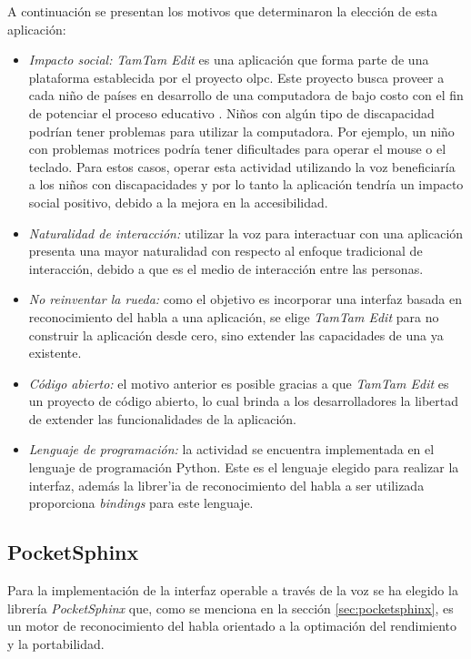 A continuaci\'on se presentan los motivos que determinaron la elecci\'on de esta aplicaci\'on:

\begin{itemize}
    \item \emph{Impacto social:} \emph{TamTam Edit} es una aplicaci\'on que forma parte de una plataforma establecida
    por el proyecto \gls{olpc}. Este proyecto busca proveer
	a cada ni\~no de pa\'ises en desarrollo de una computadora de bajo costo con el
	fin de potenciar el proceso educativo \cite{OLPC}. Ni\~nos con alg\'un tipo de discapacidad podr\'ian tener
	problemas para utilizar la computadora. Por ejemplo, un ni\~no con problemas motrices podr\'ia tener dificultades para operar el mouse
	o el teclado. Para estos casos, operar esta actividad utilizando la voz beneficiar\'ia a los ni\~nos con discapacidades
	y por lo tanto la aplicaci\'on tendr\'ia un impacto social positivo, debido a la mejora en la accesibilidad.
    \item \emph{Naturalidad de interacci\'on:} utilizar la voz para interactuar con una aplicaci\'on presenta una mayor
	naturalidad con respecto al enfoque tradicional de interacci\'on, debido a que es el medio de
	interacci\'on entre las personas.
    \item \emph{No reinventar la rueda:} como el objetivo es incorporar una interfaz basada en reconocimiento del habla a una aplicaci\'on,
	se elige \emph{TamTam Edit} para no construir la aplicaci\'on desde cero, sino extender las capacidades de una ya existente.
    \item \emph{C\'odigo abierto:} el motivo anterior es posible gracias a que \emph{TamTam Edit} es un proyecto de c\'odigo abierto, lo cual
	brinda a los desarrolladores la libertad de extender las funcionalidades de la aplicaci\'on.
    \item \emph{Lenguaje de programaci\'on:} la actividad se encuentra implementada en el lenguaje de programaci\'on Python. Este es el
	lenguaje elegido para realizar la interfaz, adem\'as la librer'ia de reconocimiento del habla a ser utilizada proporciona
	\emph{bindings} para este lenguaje.
\end{itemize}



\subsection{PocketSphinx}

Para la implementaci\'on de la interfaz operable a trav\'es de la voz se ha elegido la librer\'ia \emph{PocketSphinx} que,
como se menciona en la secci\'on \ref{sec:pocketsphinx}, es un motor de reconocimiento del habla orientado a la optimaci\'on
del rendimiento y la portabilidad.

